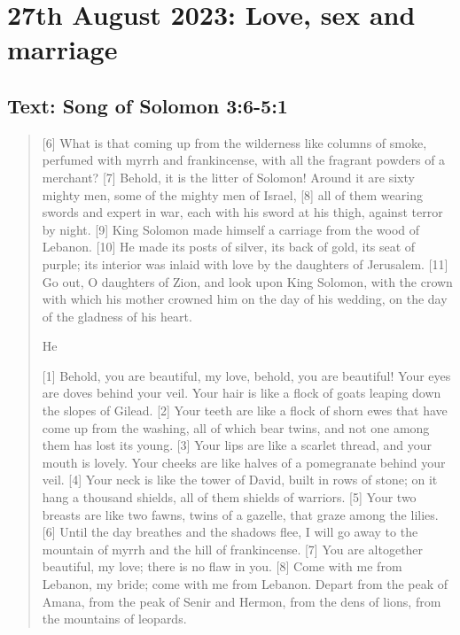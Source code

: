 \setcounter{figure}{0}

\section{27th August 2023: Love, sex and marriage}
\subsection*{Text: Song of Solomon 3:6-5:1}
  \begin{quote}
    [6] What is that coming up from the wilderness
        like columns of smoke,
    perfumed with myrrh and frankincense,
        with all the fragrant powders of a merchant?
    [7] Behold, it is the litter of Solomon!
    Around it are sixty mighty men,
        some of the mighty men of Israel,
    [8] all of them wearing swords
        and expert in war,
    each with his sword at his thigh,
        against terror by night.
    [9] King Solomon made himself a carriage
        from the wood of Lebanon.
    [10] He made its posts of silver,
        its back of gold, its seat of purple;
    its interior was inlaid with love
        by the daughters of Jerusalem.
    [11] Go out, O daughters of Zion,
        and look upon King Solomon,
    with the crown with which his mother crowned him
        on the day of his wedding,
        on the day of the gladness of his heart.


        He

    [1] Behold, you are beautiful, my love,
        behold, you are beautiful!
    Your eyes are doves
        behind your veil.
    Your hair is like a flock of goats
        leaping down the slopes of Gilead.
    [2] Your teeth are like a flock of shorn ewes
        that have come up from the washing,
    all of which bear twins,
        and not one among them has lost its young.
    [3] Your lips are like a scarlet thread,
        and your mouth is lovely.
    Your cheeks are like halves of a pomegranate
        behind your veil.
    [4] Your neck is like the tower of David,
        built in rows of stone;
    on it hang a thousand shields,
        all of them shields of warriors.
    [5] Your two breasts are like two fawns,
        twins of a gazelle,
        that graze among the lilies.
    [6] Until the day breathes
        and the shadows flee,
    I will go away to the mountain of myrrh
        and the hill of frankincense.
    [7] You are altogether beautiful, my love;
        there is no flaw in you.
    [8] Come with me from Lebanon, my bride;
        come with me from Lebanon.
    Depart from the peak of Amana,
        from the peak of Senir and Hermon,
    from the dens of lions,
        from the mountains of leopards.



\end{quote}
